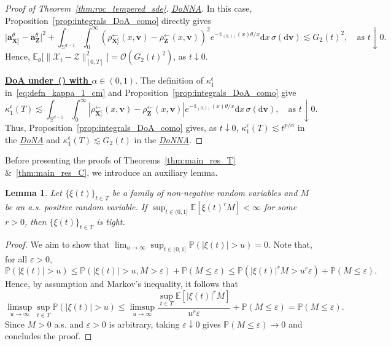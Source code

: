 \documentclass[en,oneside,bbfont,article]{amsart}
\newtheorem{lemma}[theorem]{Lemma}
\theoremstyle{remark}
\theoremstyle{definition}
\theoremstyle{definition}
\newcommand\ve{\varepsilon}
\newcommand\X{\bm{\mathcal{X}}}
\newcommand\ZZ{\bm{\mathcal{Z}}}
\newcommand\Sp{\mathbb{S}}
\newcommand\E{\mathds{E}}
\newcommand\p{\mathds{P}}
\newcommand\1{\mathds{1}}
\newcommand\Oh{\mathcal{O}}
\newcommand\da{\downarrow}
\newcommand\la{\leftarrow}
\renewcommand\le{\leqslant}
\newcommand\co{\mathsf{c}}
\newcommand{\D}{\mathrm{d}}
\newcommand{\mfc}{{\mathfrak{c}}}
\begin{document}
\begin{proof}[Proof of Theorem~\ref{thm:roc_tempered_sde}]
{\underline{\textit{DoNNA}}}. In this case, Proposition~\ref{prop:integrals_DoA_como} directly gives
\[
\big|\bm{a}_{\bm{X}^\co_t}^\theta-\bm{a}_{\bm{Z}}^\theta\big|^2
+\int_{\Sp^{d-1}}\int_0^\infty
(\rho_{\bm{X}_t^\co}^{\la}(x,\bm{v})-\rho_{\bm{Z}}^{\la}(x,\bm{v}))^2 e^{-\1_{(0,1)}(x) \theta/x } \D x \, \sigma(\D \bm{v})
\lesssim G_2(t)^2,
\quad\text{as }t\da 0.
\]
Hence, $\E_\theta\big[\|\X_t-\ZZ\|_{[0,T]}^2\big] =\Oh(G_2(t)^2)$, as $t \da 0$.

\underline{\textbf{DoA under~() with $\alpha\in(0,1)$}}. The definition of $\kappa_1^\mfc$ in~\eqref{eq:defn_kappa_1_cm} and Proposition~\ref{prop:integrals_DoA_como} give
\[
\kappa_1^\mfc(T)
\lesssim \int_{\Sp^{d-1}} \int_0^\infty|\rho_{\bm{X}_t^\co}^{\la}(x,\bm{v})-\rho_{\bm{Z}}^{\la}(x,\bm{v})|e^{-\1_{(0,1)}(x) \theta/x }  \D x \,\sigma(\D \bm{v}),
\quad\text{as }t\da 0.
\] 
Thus, Proposition~\ref{prop:integrals_DoA_como} gives, as $t\da 0$, $\kappa_1^\mfc(T)\lesssim t^{p/\alpha}$ in the \underline{\textit{DoNA}} and $\kappa_1^\mfc(T)\lesssim G_2(t)$ in the \underline{\textit{DoNNA}}.
\end{proof}

Before presenting the proofs of Theorems~\ref{thm:main_res_T} \&~\ref{thm:main_res_C}, we introduce an auxiliary lemma.

\begin{lemma}
\label{lem:Lp-Girsanov-to-cip}
Let $\{\xi(t)\}_{t\in T}$ be a family of non-negative random variables and $M$ be an a.s. positive random variable. If $\sup_{t\in(0,1]}\E[\xi(t)^rM]<\infty$ for some $r>0$, then $\{\xi(t)\}_{t\in T}$ is tight.
\end{lemma}

\begin{proof}
We aim to show that $\lim_{u\to\infty}\sup_{t \in (0,1]}\p(|\xi(t)|>u)=0$. Note that, for all $\ve>0$,
\[
\p(|\xi(t)|>u)
\le\p(|\xi(t)|>u, M>\ve) + \p(M\le \ve)
\le \p(|\xi(t)|^rM>u^r\ve) + \p(M\le \ve).
\]
Hence, by assumption and Markov's inequality, it follows that
\[
\limsup_{u\to\infty}\sup_{t\in T}\p(|\xi(t)|>u)
\le
 \limsup_{u\to\infty}\frac{\sup_{t\in T}\E[|\xi(t)|^rM]}{u^r\ve}
+\p(M\le \ve)
=\p(M\le \ve).
\]
Since $M>0$ a.s. and $\ve>0$ is arbitrary, taking $\ve\da 0$ gives $\p(M\le \ve) \to 0$ and concludes the proof.
\end{proof}
\end{document}

